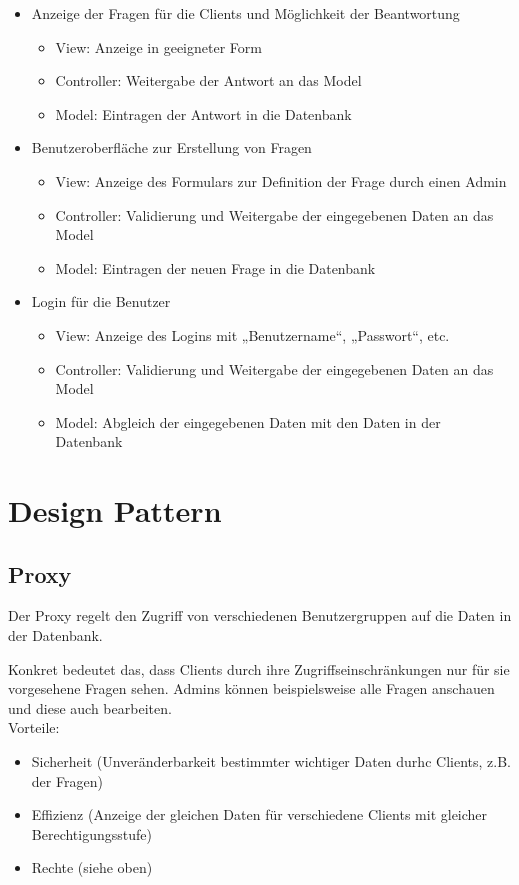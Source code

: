 \documentclass[a4paper,10pt]{article}
\begin{document}
\begin{itemize}
\item Anzeige der Fragen für die Clients und Möglichkeit der Beantwortung
   \begin{itemize}
   \item View: Anzeige in geeigneter Form
   \item Controller: Weitergabe der Antwort an das Model
   \item Model: Eintragen der Antwort in die Datenbank
   \end{itemize}
\item Benutzeroberfläche zur Erstellung von Fragen
   \begin{itemize}
   \item View: Anzeige des Formulars zur Definition der Frage durch einen Admin
   \item Controller: Validierung und Weitergabe der eingegebenen Daten an das Model
   \item Model: Eintragen der neuen Frage in die Datenbank
   \end{itemize}
\newpage
\item Login für die Benutzer
   \begin{itemize}
   \item View: Anzeige des Logins mit „Benutzername“, „Passwort“, etc.
   \item Controller: Validierung und Weitergabe der eingegebenen Daten an das Model
   \item Model: Abgleich der eingegebenen Daten mit den Daten in der Datenbank                                                                           \end{itemize}
\end{itemize}


\section{Design Pattern}
\subsection{Proxy}

Der Proxy regelt den Zugriff von verschiedenen Benutzergruppen auf die Daten in der Datenbank.

\noindent
Konkret bedeutet das, dass Clients durch ihre Zugriffseinschränkungen nur für sie vorgesehene Fragen sehen. Admins können beispielsweise alle Fragen anschauen und diese auch bearbeiten.
\\[1em]
\noindent
Vorteile:
\begin{itemize}
\item Sicherheit (Unveränderbarkeit bestimmter wichtiger Daten durhc Clients, z.B. der Fragen)
\item Effizienz (Anzeige der gleichen Daten für verschiedene Clients mit gleicher Berechtigungsstufe)
\item Rechte (siehe oben)
\end{itemize}
\end{document}
